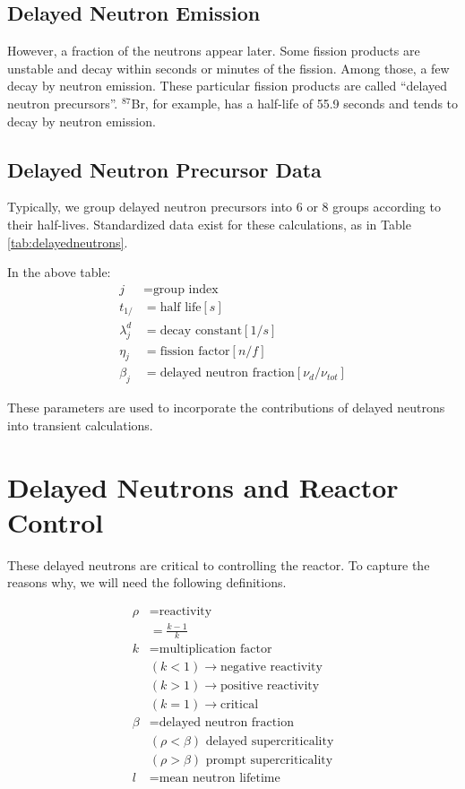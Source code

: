 \documentclass[12pt]{article}
\begin{document}
\subsection{Delayed Neutron Emission}
However, a fraction of the neutrons appear later. Some fission products are 
unstable and decay within seconds or minutes of the fission. Among those, a few 
decay by neutron emission. These particular fission products are called ``delayed 
neutron precursors''.  $^{87}$Br, for example, has a half-life of 55.9 seconds 
and tends to decay by neutron emission.

\subsection{Delayed Neutron Precursor Data}
Typically, we group delayed neutron precursors into 6 or 8 groups according to 
their half-lives. Standardized data exist for these calculations, as in Table 
\ref{tab:delayedneutrons}.



In the above table:
\begin{align}
j &= \mbox{group index}\\
t_{1/} &= \mbox{half life} [s]\\
\lambda_j^d &= \mbox{decay constant} [1/s]\\
\eta_j &= \mbox{fission factor} [n/f]\\
\beta_j &= \mbox{delayed neutron fraction} [\nu_d/\nu_{tot}]
\end{align}

These parameters are used to incorporate the contributions of delayed neutrons 
into transient calculations.

\section{Delayed Neutrons and Reactor Control}
These delayed neutrons are critical to controlling the reactor. 
To capture the reasons why, we will need the following definitions.

\begin{align}
\rho &= \mbox{reactivity}\\
&= \frac{k-1}{k}\\
k &= \mbox{multiplication factor}\\
&(k < 1) \rightarrow \mbox{negative reactivity}\\
&(k > 1) \rightarrow \mbox{positive reactivity}\\
&(k = 1) \rightarrow \mbox{critical}\\
\beta &= \mbox{delayed neutron fraction}\\
&(\rho < \beta) \mbox{ delayed supercriticality}\\
&(\rho > \beta) \mbox{ prompt supercriticality}\\
l &= \mbox{mean neutron lifetime}
\end{align}
\end{document}
